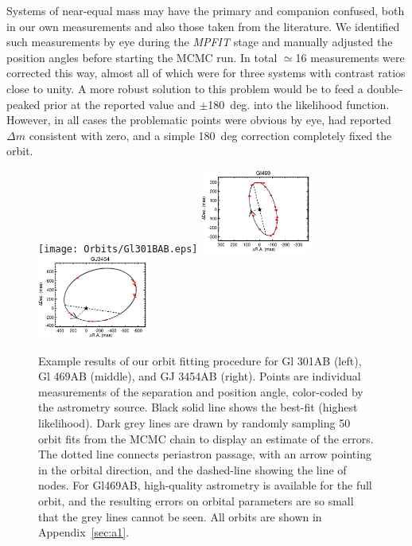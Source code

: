 \documentclass[twocolumn]{aastex62}
\begin{document}
Systems of near-equal mass may have the primary and companion confused, both in our own measurements and also those taken from the literature. We identified such measurements by eye during the \textit{MPFIT} stage and manually adjusted the position angles before starting the MCMC run. In total $\simeq$16 measurements were corrected this way, almost all of which were for three systems with contrast ratios close to unity. A more robust solution to this problem would be to feed a double-peaked prior at the reported value and $\pm$180~deg. into the likelihood function. However, in all cases the problematic points were obvious by eye, had reported $\Delta m$ consistent with zero, and a simple 180~deg correction completely fixed the orbit. 


\begin{figure}[htb]
\begin{center}
\texttt{[image: Orbits/Gl301BAB.eps]}
\includegraphics[width=0.32\textwidth]{Orbits/Gl469AB.eps}
\includegraphics[width=0.32\textwidth]{Orbits/GJ3454AB.eps}
\caption{Example results of our orbit fitting procedure for Gl 301AB (left), Gl 469AB (middle), and GJ 3454AB (right). Points are individual measurements of the separation and position angle, color-coded by the astrometry source. Black solid line shows the best-fit (highest likelihood). Dark grey lines are drawn by randomly sampling 50 orbit fits from the MCMC chain to display an estimate of the errors. The dotted line connects periastron passage, with an arrow pointing in the orbital direction, and the dashed-line showing the line of nodes. For Gl469AB, high-quality astrometry is available for the full orbit, and the resulting errors on orbital parameters are so small that the grey lines cannot be seen. All orbits are shown in Appendix~\ref{sec:a1}.}
\label{fig:orbits}
\end{center}
\end{figure}
\end{document}
